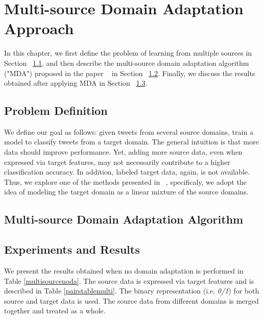 \cleardoublepage

\chapter{Multi-source Domain Adaptation Approach}
\label{mdachapter}

In this chapter, we first define the problem of learning from multiple sources in Section ~\ref{mdaproblemdefinitions}, and then describe the multi-source domain adaptation algorithm ("MDA") proposed in the paper ~\citep{mda} in Section ~\ref{mdaalg}. Finally, we discuss the results obtained after applying MDA in Section ~\ref{mdaexperiments}.


\section{Problem Definition}
\label{mdaproblemdefinitions}

We define our goal as follows: given tweets from several source domains, train a model to classify tweets from a target domain. The general intuition is that more data should improve performance. Yet, adding more source data, even when expressed via target features, may not necessarily contribute to a higher classification accuracy. In addition, labeled target data, again, is not available. Thus, we explore one of the methods presented in ~\citep{mda}, specificaly, we adopt the idea of modeling the target domain as a linear mixture of the source domains. 

\section{Multi-source Domain Adaptation Algorithm}
\label{mdaalg}




\section{Experiments and Results}
\label{mdaexperiments}

We present the results obtained when no domain adaptation is performed in Table \ref{multisourcenoda}. The source data is expressed via target features and is described in Table \ref{pairstablemulti}. The binary representation (i.e. \textit{0/1}) for both source and target data is used. The source data from different domains is merged together and treated as a whole.

